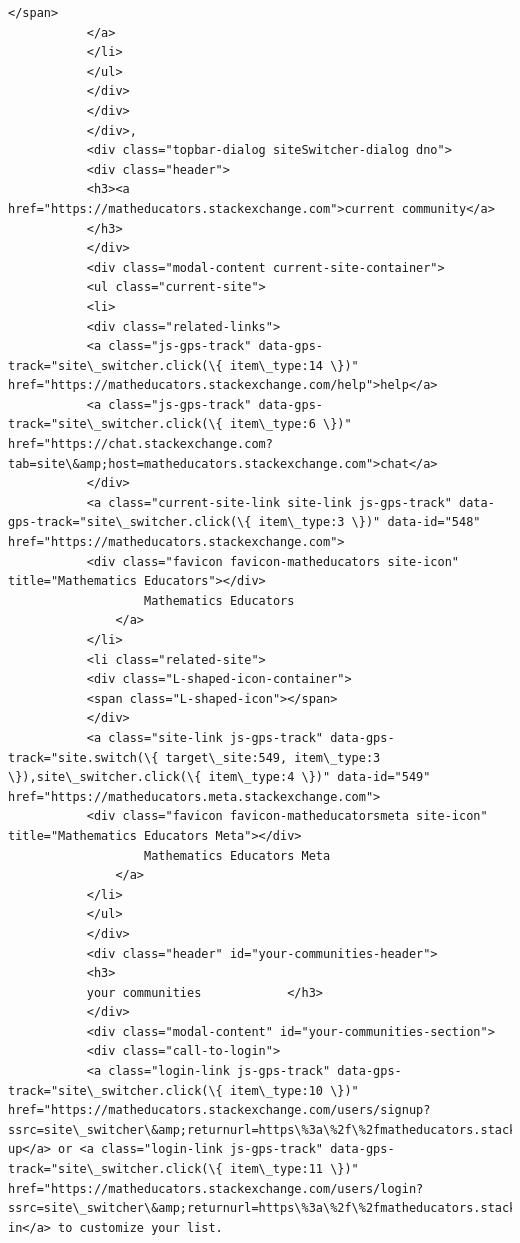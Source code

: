 \documentclass[11pt]{article}
\begin{document}
\begin{Verbatim}[commandchars=\\\{\}]
                                           </span>
           </a>
           </li>
           </ul>
           </div>
           </div>
           </div>,
           <div class="topbar-dialog siteSwitcher-dialog dno">
           <div class="header">
           <h3><a href="https://matheducators.stackexchange.com">current community</a>
           </h3>
           </div>
           <div class="modal-content current-site-container">
           <ul class="current-site">
           <li>
           <div class="related-links">
           <a class="js-gps-track" data-gps-track="site\_switcher.click(\{ item\_type:14 \})" href="https://matheducators.stackexchange.com/help">help</a>
           <a class="js-gps-track" data-gps-track="site\_switcher.click(\{ item\_type:6 \})" href="https://chat.stackexchange.com?tab=site\&amp;host=matheducators.stackexchange.com">chat</a>
           </div>
           <a class="current-site-link site-link js-gps-track" data-gps-track="site\_switcher.click(\{ item\_type:3 \})" data-id="548" href="https://matheducators.stackexchange.com">
           <div class="favicon favicon-matheducators site-icon" title="Mathematics Educators"></div>
                   Mathematics Educators
               </a>
           </li>
           <li class="related-site">
           <div class="L-shaped-icon-container">
           <span class="L-shaped-icon"></span>
           </div>
           <a class="site-link js-gps-track" data-gps-track="site.switch(\{ target\_site:549, item\_type:3 \}),site\_switcher.click(\{ item\_type:4 \})" data-id="549" href="https://matheducators.meta.stackexchange.com">
           <div class="favicon favicon-matheducatorsmeta site-icon" title="Mathematics Educators Meta"></div>
                   Mathematics Educators Meta
               </a>
           </li>
           </ul>
           </div>
           <div class="header" id="your-communities-header">
           <h3>
           your communities            </h3>
           </div>
           <div class="modal-content" id="your-communities-section">
           <div class="call-to-login">
           <a class="login-link js-gps-track" data-gps-track="site\_switcher.click(\{ item\_type:10 \})" href="https://matheducators.stackexchange.com/users/signup?ssrc=site\_switcher\&amp;returnurl=https\%3a\%2f\%2fmatheducators.stackexchange.com\%2f">Sign up</a> or <a class="login-link js-gps-track" data-gps-track="site\_switcher.click(\{ item\_type:11 \})" href="https://matheducators.stackexchange.com/users/login?ssrc=site\_switcher\&amp;returnurl=https\%3a\%2f\%2fmatheducators.stackexchange.com\%2f">log in</a> to customize your list.

\end{Verbatim}
\end{document}
